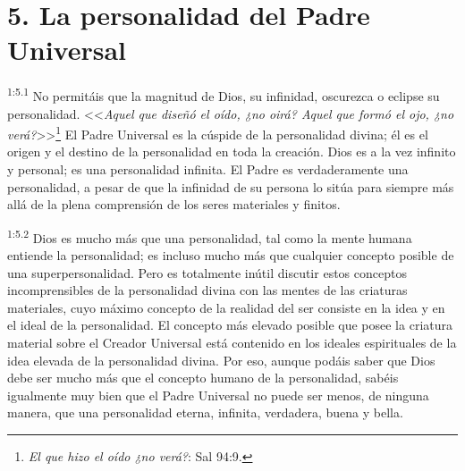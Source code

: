 \section*{5. La personalidad del Padre Universal}
\par
\textsuperscript{1:5.1} No permitáis que la magnitud de Dios, su infinidad, oscurezca o eclipse su personalidad. <<\textit{Aquel que diseñó el oído, ¿no oirá? Aquel que formó el ojo, ¿no verá?}>>\footnote{\textit{El que hizo el oído ¿no verá?}: Sal 94:9.} El Padre Universal es la cúspide de la personalidad divina; él es el origen y el destino de la personalidad en toda la creación. Dios es a la vez infinito y personal; es una personalidad infinita. El Padre es verdaderamente una personalidad, a pesar de que la infinidad de su persona lo sitúa para siempre más allá de la plena comprensión de los seres materiales y finitos.

\par
\textsuperscript{1:5.2} Dios es mucho más que una personalidad, tal como la mente humana entiende la personalidad; es incluso mucho más que cualquier concepto posible de una superpersonalidad. Pero es totalmente inútil discutir estos conceptos incomprensibles de la personalidad divina con las mentes de las criaturas materiales, cuyo máximo concepto de la realidad del ser consiste en la idea y en el ideal de la personalidad. El concepto más elevado posible que posee la criatura material sobre el Creador Universal está contenido en los ideales espirituales de la idea elevada de la personalidad divina. Por eso, aunque podáis saber que Dios debe ser mucho más que el concepto humano de la personalidad, sabéis igualmente muy bien que el Padre Universal no puede ser menos, de ninguna manera, que una personalidad eterna, infinita, verdadera, buena y bella.

